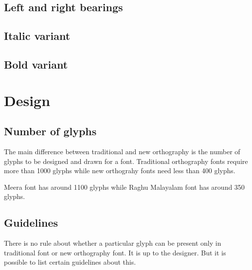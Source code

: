 \subsection {Left and right bearings}
\subsection {Italic variant}
\subsection {Bold variant}

\section{Design}
\subsection{Number of glyphs}

The main difference between traditional and new orthography is the number of
glyphs to be designed and drawn for a font.
Traditional orthography fonts require more than 1000 glyphs while new orthograhy
fonts need less than 400 glyphs.

Meera font has around 1100 glyphs while Raghu Malayalam font has around 350
glyphs.

\subsection{Guidelines}

There is no rule about whether a particular glyph can be present only in
traditional font or new orthography font. It is up to the designer. But it is
possible to list certain guidelines about this.

